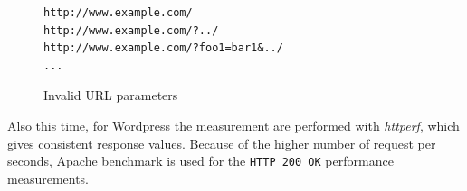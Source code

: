 \documentclass[Methods]{subfiles}
\begin{document}
\begin{figure}[H]
\caption{Invalid URL parameters}
\begin{verbatim}
http://www.example.com/
http://www.example.com/?../
http://www.example.com/?foo1=bar1&../
...
\end{verbatim}
\label{fig:invalid_rule_increments}
\end{figure}

Also this time, for Wordpress the measurement are performed with \textit{httperf}, which gives consistent response values. Because of the higher number of request per seconds, Apache benchmark is used for the \verb+HTTP 200 OK+ performance measurements.
\end{document}
